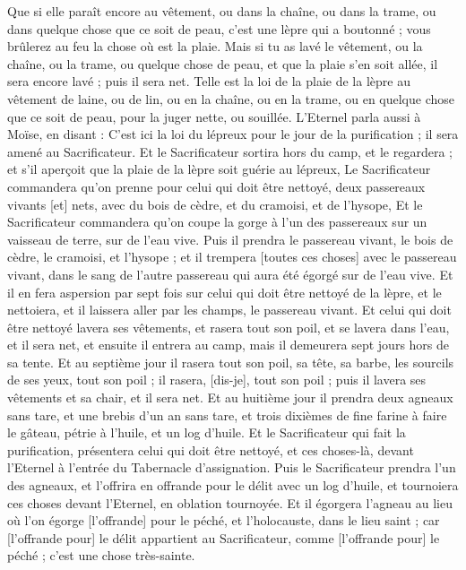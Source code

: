 \begin{multicols}{2}
Que si elle paraît encore au vêtement, ou dans la chaîne, ou dans la trame, ou dans quelque chose que ce soit de peau, c'est une lèpre qui a boutonné ; vous brûlerez au feu la chose où est la plaie.
Mais si tu as lavé le vêtement, ou la chaîne, ou la trame, ou quelque chose de peau, et que la plaie s'en soit allée, il sera encore lavé ; puis il sera net.
Telle est la loi de la plaie de la lèpre au vêtement de laine, ou de lin, ou en la chaîne, ou en la trame, ou en quelque chose que ce soit de peau, pour la juger nette, ou souillée.
\VerseOne{}L'Eternel parla aussi à Moïse, en disant :
C'est ici la loi du lépreux pour le jour de la purification ; il sera amené au Sacrificateur.
Et le Sacrificateur sortira hors du camp, et le regardera ; et s'il aperçoit que la plaie de la lèpre soit guérie au lépreux,
Le Sacrificateur commandera qu'on prenne pour celui qui doit être nettoyé, deux passereaux vivants [et] nets, avec du bois de cèdre, et du cramoisi, et de l'hysope,
Et le Sacrificateur commandera qu'on coupe la gorge à l'un des passereaux sur un vaisseau de terre, sur de l'eau vive.
Puis il prendra le passereau vivant, le bois de cèdre, le cramoisi, et l'hysope ; et il trempera [toutes ces choses] avec le passereau vivant, dans le sang de l'autre passereau qui aura été égorgé sur de l'eau vive.
Et il en fera aspersion par sept fois sur celui qui doit être nettoyé de la lèpre, et le nettoiera, et il laissera aller par les champs, le passereau vivant.
Et celui qui doit être nettoyé lavera ses vêtements, et rasera tout son poil, et se lavera dans l'eau, et il sera net, et ensuite il entrera au camp, mais il demeurera sept jours hors de sa tente.
Et au septième jour il rasera tout son poil, sa tête, sa barbe, les sourcils de ses yeux, tout son poil ; il rasera, [dis-je], tout son poil ; puis il lavera ses vêtements et sa chair, et il sera net.
Et au huitième jour il prendra deux agneaux sans tare, et une brebis d'un an sans tare, et trois dixièmes de fine farine à faire le gâteau, pétrie à l'huile, et un log d'huile.
Et le Sacrificateur qui fait la purification, présentera celui qui doit être nettoyé, et ces choses-là, devant l'Eternel à l'entrée du Tabernacle d'assignation.
Puis le Sacrificateur prendra l'un des agneaux, et l'offrira en offrande pour le délit avec un log d'huile, et tournoiera ces choses devant l'Eternel, en oblation tournoyée.
Et il égorgera l'agneau au lieu où l'on égorge [l'offrande] pour le péché, et l'holocauste, dans le lieu saint ; car [l'offrande pour] le délit appartient au Sacrificateur, comme [l'offrande pour] le péché ; c'est une chose très-sainte.

\end{multicols}
